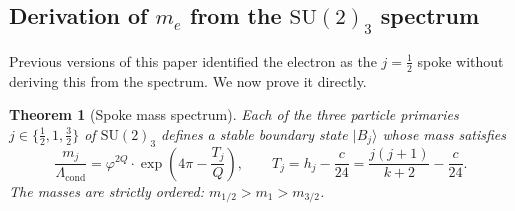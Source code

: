 \documentclass[11pt,a4paper]{article}
\newtheorem{theorem}{Theorem}[section]
\theoremstyle{definition}
\theoremstyle{remark}
\newcommand{\vp}{\varphi}
\newcommand{\Lcond}{\Lambda_{\mathrm{cond}}}
\begin{document}
\subsection{Derivation of $m_e$ from the $\mathrm{SU}(2)_3$ spectrum}
\label{P4:sec:me_from_spectrum}

Previous versions of this paper identified the electron as the
$j=\tfrac{1}{2}$ spoke without deriving this from the spectrum.
We now prove it directly.

\begin{theorem}[Spoke mass spectrum]
\label{P4:thm:spoke_mass_spectrum}
Each of the three particle primaries $j\in\{\tfrac{1}{2},1,\tfrac{3}{2}\}$
of $\mathrm{SU}(2)_3$ defines a stable boundary state $|B_j\rangle$ whose
mass satisfies
\begin{equation}
  \frac{m_j}{\Lcond}
  = \vp^{2Q}\cdot\exp\!\left(4\pi - \frac{T_j}{Q}\right),
  \qquad
  T_j = h_j - \frac{c}{24} = \frac{j(j+1)}{k+2} - \frac{c}{24}.
  \label{P4:eq:spoke_mass_spectrum}
\end{equation}
The masses are strictly ordered: $m_{1/2} > m_1 > m_{3/2}$.
\end{theorem}
\end{document}
